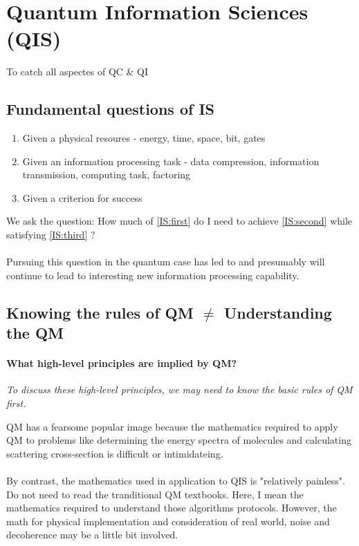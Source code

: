 \documentclass[]{article}
\theoremstyle{nonumberplain}
\begin{document}
\section{Quantum Information Sciences (QIS)}%
\label{sec:quantum_information_sciences}
To catch all aspectes of QC \& QI
\subsection{Fundamental questions of IS}
\begin{enumerate}
	\item \label{IS:first} Given a physical resoures - energy, time, space, bit, gates
	\item \label{IS:second} Given an information processing task - data compression, information transmission, computing task, factoring
	\item \label{IS:third} Given a criterion for success
\end{enumerate}
We ask the question: How much of \ref{IS:first} do I need to achieve \ref{IS:second} while satisfying \ref{IS:third} ?
\\
\\
Pursuing this question in the quantum case has led to and presumably will continue to lead to interesting new information processing capability.
\subsection{Knowing the rules of QM $\neq$ Understanding the QM}
\paragraph{\textbf{What high-level principles are implied by QM?}}%
\label{par:paragraph_name}
\begin{center}
	\textit{To discuss these high-level principles, we may need to know the basic rules of QM first.}\\
\end{center}
QM has a fearsome popular image because the mathematics required to apply QM to problems like determining the energy spectra of molecules and calculating scattering cross-section is difficult or intimidateing.\\
\\
By contrast, the mathematics used in application to QIS is "relatively painless". Do not need to read the tranditional QM textbooks. Here, I mean the mathematics required to understand those algorithms protocols. However, the math for physical implementation and consideration of real world, noise and decoherence may be a little bit involved.\\
\end{document}
